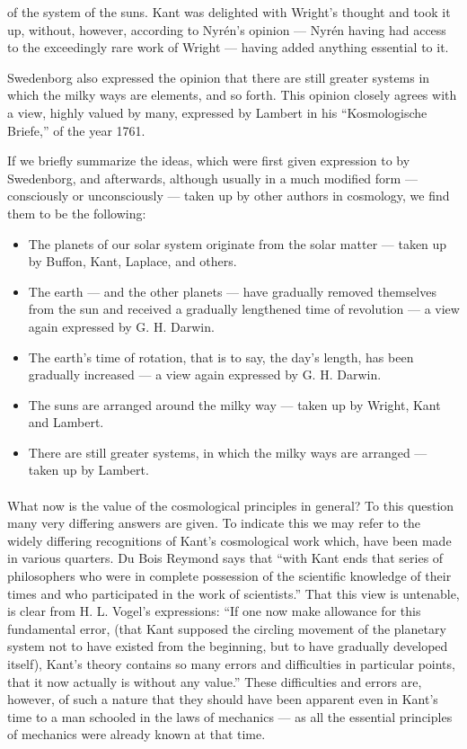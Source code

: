 \documentclass[a4paper, 11pt, oneside, polutonikogreek, english]{article}
\begin{document}
of the system of the suns. Kant was delighted with Wright's thought and took it up, without, however, according to Nyrén's opinion --- Nyrén having had access to the exceedingly rare work of Wright --- having added anything essential to it.

Swedenborg also expressed the opinion that there are still greater systems in which the milky ways are elements, and so forth. This opinion closely agrees with a view, highly valued by many, expressed by Lambert in his ``Kosmologische Briefe,'' of the year 1761.

If we briefly summarize the ideas, which were first given expression to by Swedenborg, and afterwards, although usually in a much modified form --- consciously or unconsciously --- taken up by other authors in cosmology, we find them to be the following:
\begin{itemize}
    \item The planets of our solar system originate from the solar matter --- taken up by Buffon, Kant, Laplace, and others.

    \item The earth --- and the other planets --- have gradually removed themselves from the sun and received a gradually lengthened time of revolution --- a view again expressed by G. H. Darwin.

    \item The earth's time of rotation, that is to say, the day's length, has been gradually increased --- a view again expressed by G. H. Darwin.

    \item The suns are arranged around the milky way --- taken up by Wright, Kant and Lambert.

    \item There are still greater systems, in which the milky ways are arranged --- taken up by Lambert.
\end{itemize}
\paragraph{}
What now is the value of the cosmological principles in general? To this question many very differing answers are given. To indicate this we may refer to the widely differing recognitions of Kant's cosmological work which, have been made in various quarters. Du Bois Reymond says that ``with Kant ends that series of philosophers who were in complete possession of the scientific knowledge of their times and who participated in the work of scientists.'' That this view is untenable, is clear from H. L. Vogel's expressions: ``If one now make allowance for this fundamental error, (that Kant supposed the circling movement of the planetary system not to have existed from the beginning, but to have gradually developed itself), Kant's theory contains so many errors and difficulties in particular points, that it now actually is without any value.'' These difficulties and errors are, however, of such a nature that they should have been apparent even in Kant's time to a man schooled in the laws of mechanics --- as all the essential principles of mechanics were already known at that time.
\end{document}
